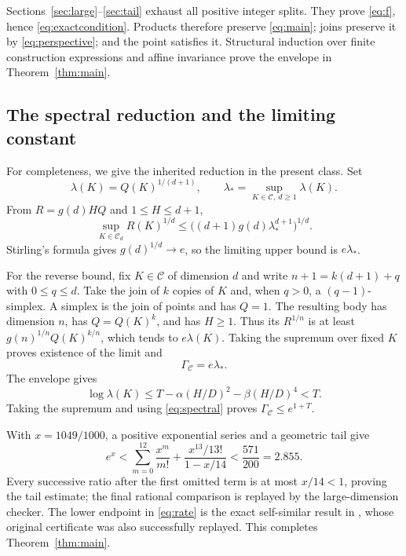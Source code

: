 \documentclass[11pt]{article}
\theoremstyle{remark}
\newcommand{\CC}{\mathcal C}
\begin{document}
Sections~\ref{sec:large}--\ref{sec:tail} exhaust all positive integer splits. They prove \eqref{eq:f}, hence \eqref{eq:exactcondition}. Products therefore preserve \eqref{eq:main}; joins preserve it by \eqref{eq:perspective}; and the point satisfies it. Structural induction over finite construction expressions and affine invariance prove the envelope in Theorem~\ref{thm:main}.

\subsection{The spectral reduction and the limiting constant}

For completeness, we give the inherited reduction \cite{spectral} in the present class. Set
\[
 \lambda(K)=Q(K)^{1/(d+1)},\qquad \lambda_*=
 \sup_{K\in\CC,\ d\ge1}\lambda(K).
\]
From $R=g(d)HQ$ and $1\le H\le d+1$,
\[
 \sup_{K\in\CC_d}R(K)^{1/d}
 \le\bigl((d+1)g(d)\lambda_*^{d+1}\bigr)^{1/d}.
\]
Stirling's formula gives $g(d)^{1/d}\to e$, so the limiting upper bound is $e\lambda_*$.

For the reverse bound, fix $K\in\CC$ of dimension $d$ and write $n+1=k(d+1)+q$ with $0\le q\le d$. Take the join of $k$ copies of $K$ and, when $q>0$, a $(q-1)$-simplex. A simplex is the join of points and has $Q=1$. The resulting body has dimension $n$, has $Q=Q(K)^k$, and has $H\ge1$. Thus its $R^{1/n}$ is at least $g(n)^{1/n}Q(K)^{k/n}$, which tends to $e\lambda(K)$. Taking the supremum over fixed $K$ proves existence of the limit and
\begin{equation}\label{eq:spectral}
 \Gamma_{\CC}=e\lambda_*.
\end{equation}
The envelope gives
\[
 \log\lambda(K)\le T-\alpha(H/D)^2-\beta(H/D)^4<T.
\]
Taking the supremum and using \eqref{eq:spectral} proves $\Gamma_{\CC}\le e^{1+T}$.

With $x=1049/1000$, a positive exponential series and a geometric tail give
\begin{equation}\label{eq:decimal}
 e^x<\sum_{m=0}^{12}\frac{x^m}{m!}
 +\frac{x^{13}/13!}{1-x/14}<\frac{571}{200}=2.855.
\end{equation}
Every successive ratio after the first omitted term is at most $x/14<1$, proving the tail estimate; the final rational comparison is replayed by the large-dimension checker. The lower endpoint in \eqref{eq:rate} is the exact self-similar result in \cite{calculus}, whose original certificate was also successfully replayed. This completes Theorem~\ref{thm:main}.
\end{document}
